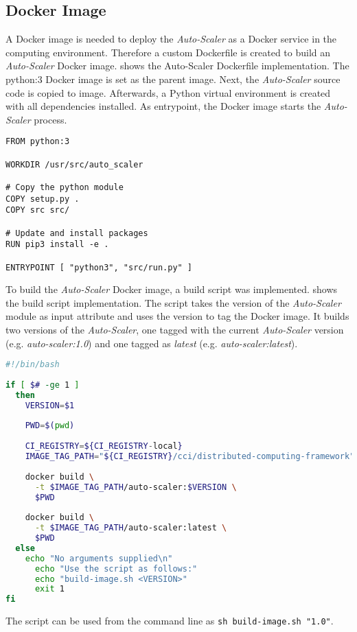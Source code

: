 \subsection{Docker Image}
A Docker image is needed to deploy the \textit{Auto-Scaler} as a Docker service in the computing environment. Therefore a custom Dockerfile is created to build an \textit{Auto-Scaler} Docker image.
 shows the Auto-Scaler Dockerfile implementation. The python:3 Docker image is set as the parent image. 
Next, the \textit{Auto-Scaler} source code is copied to image. Afterwards, a Python virtual environment is created with all dependencies installed.
As entrypoint, the Docker image starts the \textit{Auto-Scaler} process.
\begin{lstlisting}[label=lst:06_auto-scaler_dockerfile, caption=Auto-Scaler Dockerfile]
FROM python:3
 
WORKDIR /usr/src/auto_scaler
 
# Copy the python module
COPY setup.py .
COPY src src/
 
# Update and install packages
RUN pip3 install -e .
 
ENTRYPOINT [ "python3", "src/run.py" ]
\end{lstlisting}


To build the \textit{Auto-Scaler} Docker image, a build script was implemented.  shows the build script implementation.
The script takes the version of the \textit{Auto-Scaler} module as input attribute and uses the version to tag the Docker image.
It builds two versions of the \textit{Auto-Scaler}, one tagged with the current \textit{Auto-Scaler} version (e.g. \textit{auto-scaler:1.0}) and one tagged as \textit{latest} (e.g. \textit{auto-scaler:latest}).
\begin{lstlisting}[label=lst:06_auto-scaler_build, caption=Auto-Scaler build script, language=sh]
#!/bin/bash
 
if [ $# -ge 1 ]
  then
    VERSION=$1
 
    PWD=$(pwd)
 
    CI_REGISTRY=${CI_REGISTRY-local}
    IMAGE_TAG_PATH="${CI_REGISTRY}/cci/distributed-computing-framework"
 
    docker build \
      -t $IMAGE_TAG_PATH/auto-scaler:$VERSION \
      $PWD
 
    docker build \
      -t $IMAGE_TAG_PATH/auto-scaler:latest \
      $PWD
  else
    echo "No arguments supplied\n"
      echo "Use the script as follows:"
      echo "build-image.sh <VERSION>"
      exit 1
fi
\end{lstlisting}
The script can be used from the command line as \texttt{sh build-image.sh "1.0"}.

